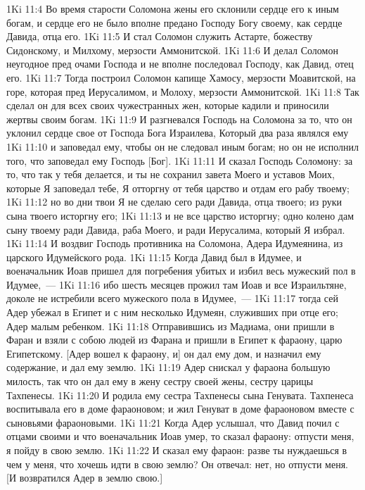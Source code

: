 \vs 1Ki 11:4 Во время старости Соломона жены его склонили сердце его к иным богам, и сердце его не было вполне предано Господу Богу своему, как сердце Давида, отца его.
\vs 1Ki 11:5 И стал Соломон служить Астарте, божеству Сидонскому, и Милхому, мерзости Аммонитской.
\vs 1Ki 11:6 И делал Соломон неугодное пред очами Господа и не вполне последовал Господу, как Давид, отец его.
\vs 1Ki 11:7 Тогда построил Соломон капище Хамосу, мерзости Моавитской, на горе, которая пред Иерусалимом, и Молоху, мерзости Аммонитской.
\vs 1Ki 11:8 Так сделал он для всех своих чужестранных жен, которые кадили и приносили жертвы своим богам.
\vs 1Ki 11:9 И разгневался Господь на Соломона за то, что он уклонил сердце свое от Господа Бога Израилева, Который два раза являлся ему
\vs 1Ki 11:10 и заповедал ему, чтобы он не следовал иным богам; но он не исполнил того, что заповедал ему Господь [Бог].
\vs 1Ki 11:11 И сказал Господь Соломону: за то, что так у тебя делается, и ты не сохранил завета Моего и уставов Моих, которые Я заповедал тебе, Я отторгну от тебя царство и отдам его рабу твоему;
\vs 1Ki 11:12 но во дни твои Я не сделаю сего ради Давида, отца твоего; из руки сына твоего исторгну его;
\vs 1Ki 11:13 и не все царство исторгну; одно колено дам сыну твоему ради Давида, раба Моего, и ради Иерусалима, который Я избрал.
\rsbpar\vs 1Ki 11:14 И воздвиг Господь противника на Соломона, Адера Идумеянина, из царского Идумейского рода.
\vs 1Ki 11:15 Когда Давид был в Идумее, и военачальник Иоав пришел для погребения убитых и избил весь мужеский пол в Идумее,~---
\vs 1Ki 11:16 ибо шесть месяцев прожил там Иоав и все Израильтяне, доколе не истребили всего мужеского пола в Идумее,~---
\vs 1Ki 11:17 тогда сей Адер убежал в Египет и с ним несколько Идумеян, служивших при отце его; Адер  малым ребенком.
\vs 1Ki 11:18 Отправившись из Мадиама, они пришли в Фаран и взяли с собою людей из Фарана и пришли в Египет к фараону, царю Египетскому. [Адер вошел к фараону, и] он дал ему дом, и назначил ему содержание, и дал ему землю.
\vs 1Ki 11:19 Адер снискал у фараона большую милость, так что он дал ему в жену сестру своей жены, сестру царицы Тахпенесы.
\vs 1Ki 11:20 И родила ему сестра Тахпенесы сына Генувата. Тахпенеса воспитывала его в доме фараоновом; и жил Генуват в доме фараоновом вместе с сыновьями фараоновыми.
\vs 1Ki 11:21 Когда Адер услышал, что Давид почил с отцами своими и что военачальник Иоав умер, то сказал фараону: отпусти меня, я пойду в свою землю.
\vs 1Ki 11:22 И сказал ему фараон: разве ты нуждаешься в чем у меня, что хочешь идти в свою землю? Он отвечал: нет, но отпусти меня. [И возвратился Адер в землю свою.]
